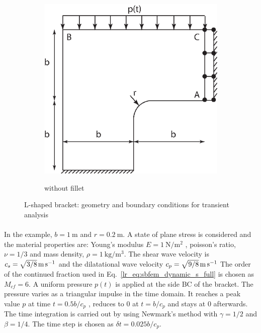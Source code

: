 \begin{figure}
\begin{subfigure}[b]{1\linewidth}
{                \includegraphics{isogeometric_sbfem/images/l_with_fillet_dynamic_geo_bc.eps}
            }
            \caption{without fillet}
        \end{subfigure}
        \caption{L-shaped bracket: geometry and boundary conditions for transient analysis}
        \label{iso_fig:l_dynamic_geo_bc}
    \end{figure}
%
\paragraph{}
In the example, $b=\SI{1}{\meter}$ and $r=\SI{0.2}{\meter}$.
A state of plane stress is considered and the material properties are:
    Young’s modulus $E = \SI{1}{\newton \per \square \meter}$ , poisson’s ratio, $\nu = 1/3$ and mass density, $\rho = \SI{1}{\kilo \gram \per \cubic \meter}$.
    The shear wave velocity is $c_s=\SI[parse-numbers = false]{\sqrt{3/8}}{\meter \per \second}$
    and the dilatational wave velocity $c_p=\SI[parse-numbers = false]{\sqrt{9/8}}{\meter \per \second}$
The order of the continued fraction used in Eq.~\ref{lr_eq:sbfem_dynamic_s_full} is chosen as $M_{cf} = 6$.
A uniform pressure $p(t)$ is applied at the side BC of the bracket.
The pressure varies as a triangular impulse in the time domain.
It reaches a peak value $p$ at time $t= 0.5b/c_p$ , reduces to $0$ at $t = b/c_p$ and stays at $0$ afterwards.
The time integration is carried out by using Newmark's method with $\gamma = 1/2$ and $\beta = 1/4$.
The time step is chosen as $\delta t = 0.025b/c_p$.

